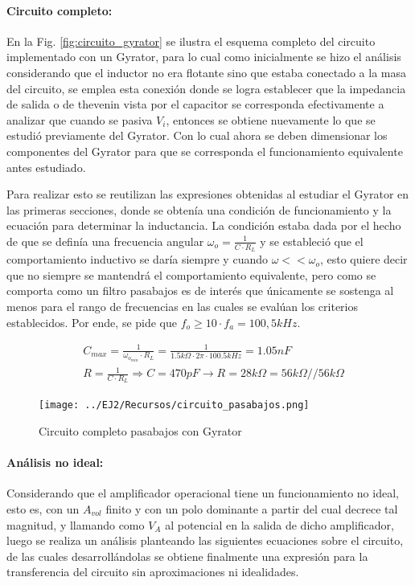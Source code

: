 \paragraph*{Circuito completo:} En la Fig. \ref{fig:circuito_gyrator} se ilustra el esquema completo del circuito implementado con un Gyrator, para lo cual como inicialmente se hizo el an\'alisis considerando que el inductor no era flotante sino que estaba conectado a la masa del circuito,
se emplea esta conexi\'on donde se logra establecer que la impedancia de salida o de thevenin vista por el capacitor se corresponda efectivamente a analizar que cuando se pasiva $V_i$, entonces se obtiene nuevamente lo que se estudi\'o previamente del Gyrator. Con lo cual ahora se deben dimensionar los componentes
del Gyrator para que se corresponda el funcionamiento equivalente antes estudiado.

Para realizar esto se reutilizan las expresiones obtenidas al estudiar el Gyrator en las primeras secciones, donde se obten\'ia una condici\'on de funcionamiento y la ecuaci\'on para determinar la inductancia.
La condici\'on estaba dada por el hecho de que se defin\'ia una frecuencia angular $\omega_o = \frac{1}{C \cdot R_L}$ y se estableci\'o que el comportamiento inductivo se dar\'ia siempre y cuando $\omega << \omega_o$, esto quiere decir que no siempre
se mantendr\'a el comportamiento equivalente, pero como se comporta como un filtro pasabajos es de inter\'es que \'unicamente se sostenga al menos para el rango de frecuencias en las cuales se eval\'uan los criterios establecidos. Por ende,
se pide que $f_o \geq 10 \cdot f_a = 100,5kHz$.

\begin{eqnarray}
    & C_{max} = \frac{1}{\omega_{o_{min}} \cdot R_L} = \frac{1}{1.5k \Omega \cdot 2\pi \cdot 100.5kHz} = 1.05nF\\
    & R = \frac{1}{C \cdot R_L} \Rightarrow C = 470pF \rightarrow R = 28k \Omega = 56k\Omega // 56k\Omega
\end{eqnarray}

\begin{figure}[H]
    \centering
    \texttt{[image: ../EJ2/Recursos/circuito\_pasabajos.png]}
    \caption{Circuito completo pasabajos con Gyrator}
    \label{fig:circuito_pasabajos}
\end{figure}

\paragraph*{An\'alisis no ideal:} Considerando que el amplificador operacional tiene un funcionamiento no ideal, esto es, con un $A_{vol}$ finito y con un polo dominante
a partir del cual decrece tal magnitud, y llamando como $V_A$ al potencial en la salida de dicho amplificador, luego se realiza un an\'alisis planteando las siguientes ecuaciones
sobre el circuito, de las cuales desarroll\'andolas se obtiene finalmente una expresi\'on para la transferencia del circuito sin aproximaciones ni idealidades.

